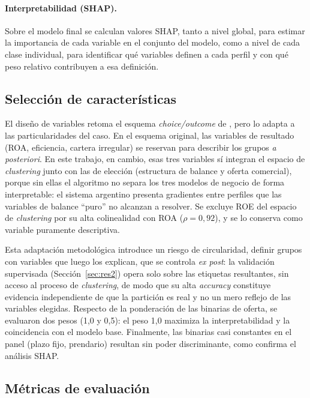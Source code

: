 \documentclass[11pt,a4paper]{article}
\begin{document}
\paragraph{Interpretabilidad (SHAP).} Sobre el modelo final se calculan valores SHAP, tanto a nivel
global, para estimar la importancia de cada variable en el conjunto del modelo, como a nivel de cada
clase individual, para identificar qué variables definen a cada perfil y con qué peso relativo
contribuyen a esa definición.

\subsection{Selección de características}
\label{sec:seleccion}

El diseño de variables retoma el esquema \textit{choice/outcome} de \citet{roengpitya2014}, pero lo
adapta a las particularidades del caso. En el esquema original, las variables de resultado (ROA,
eficiencia, cartera irregular) se reservan para describir los grupos \textit{a posteriori}. En este trabajo,
en cambio, esas tres variables sí integran el espacio de \textit{clustering} junto con las de
elección (estructura de balance y oferta comercial), porque sin ellas el algoritmo no separa los tres
modelos de negocio de forma interpretable: el sistema argentino presenta gradientes entre perfiles que las
variables de balance ``puro'' no alcanzan a resolver. Se excluye ROE del espacio de \textit{clustering} por
su alta colinealidad con ROA ($\rho = 0{,}92$), y se lo conserva como variable puramente descriptiva.

Esta adaptación metodológica introduce un riesgo de circularidad, definir grupos con variables que luego
los explican, que se controla \textit{ex post}: la validación supervisada (Sección~\ref{sec:res2}) opera
solo sobre las etiquetas resultantes, sin acceso al proceso de \textit{clustering}, de modo que su alta
\textit{accuracy} constituye evidencia independiente de que la partición es real y no un mero reflejo de
las variables elegidas. Respecto de la ponderación de las binarias de oferta, se evaluaron dos pesos (1,0
y 0,5): el peso 1,0 maximiza la interpretabilidad y la coincidencia con el modelo base. Finalmente, las
binarias casi constantes en el panel (plazo fijo, prendario) resultan sin poder discriminante, como
confirma el análisis SHAP.

\subsection{Métricas de evaluación}
\end{document}
